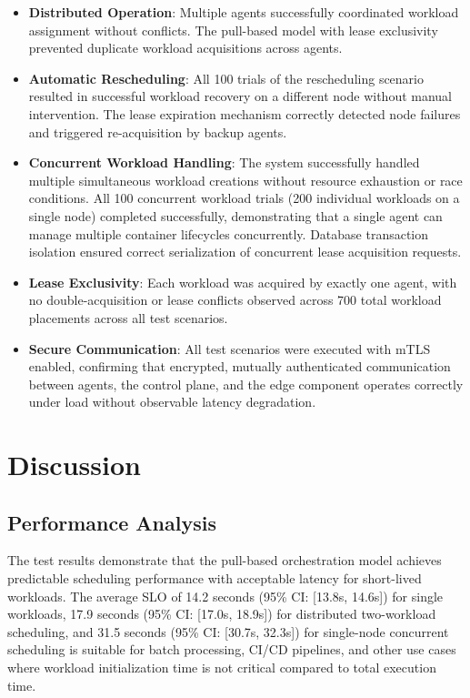 \begin{itemize}
\item \textbf{Distributed Operation}: Multiple agents successfully coordinated workload assignment without conflicts. The pull-based model with lease exclusivity prevented duplicate workload acquisitions across agents.

\item \textbf{Automatic Rescheduling}: All 100 trials of the rescheduling scenario resulted in successful workload recovery on a different node without manual intervention. The lease expiration mechanism correctly detected node failures and triggered re-acquisition by backup agents.

\item \textbf{Concurrent Workload Handling}: The system successfully handled multiple simultaneous workload creations without resource exhaustion or race conditions. All 100 concurrent workload trials (200 individual workloads on a single node) completed successfully, demonstrating that a single agent can manage multiple container lifecycles concurrently. Database transaction isolation ensured correct serialization of concurrent lease acquisition requests.

\item \textbf{Lease Exclusivity}: Each workload was acquired by exactly one agent, with no double-acquisition or lease conflicts observed across 700 total workload placements across all test scenarios.

\item \textbf{Secure Communication}: All test scenarios were executed with mTLS enabled, confirming that encrypted, mutually authenticated communication between agents, the control plane, and the edge component operates correctly under load without observable latency degradation.
\end{itemize}

\section{Discussion}

\subsection{Performance Analysis}

The test results demonstrate that the pull-based orchestration model achieves predictable scheduling performance with acceptable latency for short-lived workloads. The average SLO of 14.2 seconds (95\% CI: [13.8s, 14.6s]) for single workloads, 17.9 seconds (95\% CI: [17.0s, 18.9s]) for distributed two-workload scheduling, and 31.5 seconds (95\% CI: [30.7s, 32.3s]) for single-node concurrent scheduling is suitable for batch processing, CI/CD pipelines, and other use cases where workload initialization time is not critical compared to total execution time.

